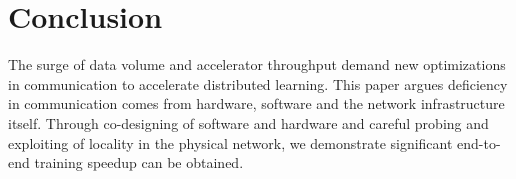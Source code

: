 \chapter{Conclusion}
The surge of data volume and accelerator throughput demand new optimizations in communication to accelerate distributed learning. This paper argues deficiency in communication comes from hardware, software and the network infrastructure itself. Through co-designing of software and hardware and careful probing and exploiting of locality in the physical network, we demonstrate significant end-to-end training speedup can be obtained.